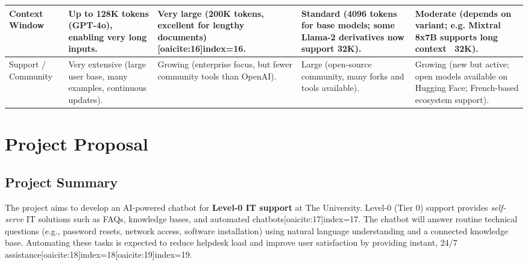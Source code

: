 \documentclass{article.cls}
\begin{document}
\begin{longtable}{|>{\raggedright}p{3cm}|>{\raggedright}p{3cm}|>{\raggedright}p{3cm}|>{\raggedright}p{3cm}|>{\raggedright\arraybackslash}p{3cm}|}
        \hline
        Context Window & Up to 128K tokens (GPT-4o), enabling very long inputs. & Very large (200K tokens, excellent for lengthy documents)[oaicite:16]{index=16}. & Standard (4096 tokens for base models; some Llama-2 derivatives now support 32K). & Moderate (depends on variant; e.g. Mixtral 8x7B supports long context ~32K). \\
        \hline
        Support / Community & Very extensive (large user base, many examples, continuous updates). & Growing (enterprise focus, but fewer community tools than OpenAI). & Large (open-source community, many forks and tools available). & Growing (new but active; open models available on Hugging Face; French-based ecosystem support). \\
        \hline
    \end{longtable}

    \section{Project Proposal}

    \subsection{Project Summary}
    The project aims to develop an AI-powered chatbot for \textbf{Level-0 IT support} at The University. Level-0 (Tier 0) support provides \textit{self-serve} IT solutions such as FAQs, knowledge bases, and automated chatbots[oaicite:17]{index=17}. The chatbot will answer routine technical questions (e.g., password resets, network access, software installation) using natural language understanding and a connected knowledge base. Automating these tasks is expected to reduce helpdesk load and improve user satisfaction by providing instant, 24/7 assistance[oaicite:18]{index=18}[oaicite:19]{index=19}.
\end{document}
